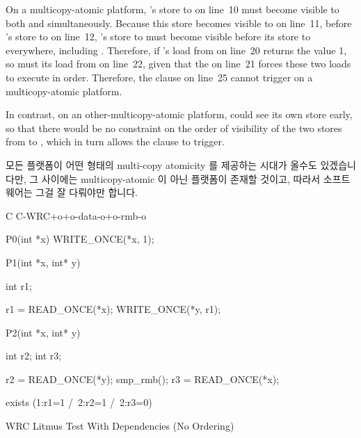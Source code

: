 {	On a multicopy-atomic platform, 's store to  on
	line~10 must become visible to both  and 
	simultaneously.
	Because this store becomes visible to  on line~11, before
	's store to  on line~12, 's store to
	 must become visible before its store to  everywhere,
	including .
	Therefore, if 's load from  on line~20 returns the
	value 1, so must its load from  on line~22, given that
	the  on line~21 forces these two loads to execute
	in order.
	Therefore, the  clause on line~25 cannot trigger on a
	multicopy-atomic platform.

	In contrast, on an other-multicopy-atomic platform, 
	could see its own store early, so that there would be no constraint
	on the order of visibility of the two stores from to ,
	which in turn allows the  clause to trigger.
	\fi
} \QuickQuizEnd

모든 플랫폼이 어떤 형태의 multi-copy atomicity 를 제공하는 시대가 올수도
있겠습니다만, 그 사이에는 multicopy-atomic 이 아닌 플랫폼이 존재할 것이고,
따라서 소프트웨어는 그걸 잘 다뤄야만 합니다.

\begin{listing}[tbp]
{ \scriptsize
\begin{verbbox}[\LstLineNo]
C C-WRC+o+o-data-o+o-rmb-o

{
}

P0(int *x)
{
  WRITE_ONCE(*x, 1);
}

P1(int *x, int* y)
{
  int r1;

  r1 = READ_ONCE(*x);
  WRITE_ONCE(*y, r1);
}

P2(int *x, int* y)
{
  int r2;
  int r3;

  r2 = READ_ONCE(*y);
  smp_rmb();
  r3 = READ_ONCE(*x);
}

exists (1:r1=1 /\ 2:r2=1 /\ 2:r3=0)
\end{verbbox}
}
\centering
\theverbbox
\caption{WRC Litmus Test With Dependencies (No Ordering)}
\label{lst:memorder:WRC Litmus Test With Dependencies (No Ordering)}
\end{listing}

